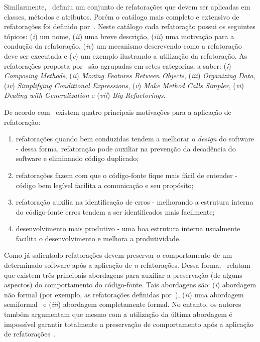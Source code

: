 Similarmente,~ definiu um conjunto de refatorações que devem ser aplicadas em classes, métodos e atributos. Porém o catálogo mais completo e extensivo de refatorações foi definido por~. Neste catálogo cada refatoração possui os seguintes tópicos: (\textit{i}) um nome, (\textit{ii}) uma breve descrição, (\textit{iii}) uma motivação para a condução da refatoração, (\textit{iv}) um mecanismo descrevendo como a refatoração deve ser executada e (\textit{v}) um exemplo ilustrando a utilização da refatoração. As refatorações proposta por~ são agrupadas em setes categorias, a saber: (\textit{i}) \textit{Composing Methods}, (\textit{ii}) \textit{Moving Features Between Objects}, (\textit{iii}) \textit{Organizing Data}, (\textit{iv}) \textit{Simplifying Conditional Expressions}, (\textit{v}) \textit{Make Method Calls Simpler}, (\textit{vi}) \textit{Dealing with Generalization} e (\textit{vii}) \textit{Big Refactorings}.

De acordo com~ existem quatro principais motivações para a aplicação de refatoração:

\begin{enumerate}
	\item refatorações quando bem conduzidas tendem a melhorar o \textit{design} do software - dessa forma, refatoração pode auxiliar na prevenção da decadência do software e eliminando código duplicado;
	\item refatorações fazem com que o código-fonte fique mais fácil de entender - código bem legível facilita a comunicação e seu propósito;
	\item refatoração auxilia na identificação de erros - melhorando a estrutura interna do código-fonte erros tendem a ser identificados mais facilmente;
	\item desenvolvimento mais produtivo - uma boa estrutura interna usualmente facilita o desenvolvimento e melhora a produtividade.
\end{enumerate}

Como já salientado refatorações devem preservar o comportamento de um determinado software após a aplicação de \textit{n} refatorações. Dessa forma,~ relatam que existem três principais abordagens para auxiliar a preservação (de alguns aspectos) do comportamento do código-fonte. Tais abordagens são: (\textit{i}) abordagem não formal (por exemplo, as refatorações definidas por~), (\textit{ii}) uma abordagem semiformal~\cite{Roberts_1999} e (\textit{iii}) abordagem completamente formal. No entanto, os autores também argumentam que mesmo com a utilização da última abordagem é impossível garantir totalmente a preservação de comportamento após a aplicação de refatorações~\cite{Mens_and_Tourwe_2004,Cinneide_2000}. 


